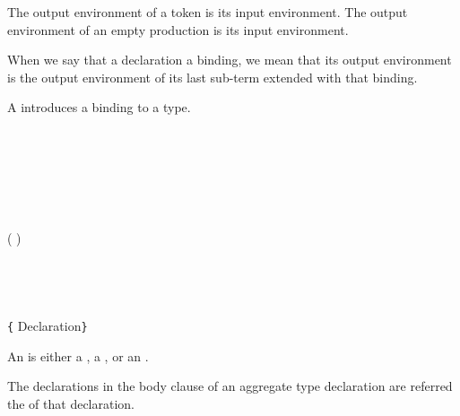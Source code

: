 The output environment of a token is its input environment.
The output environment of an empty production is its input environment.

When we say that a declaration  a binding, we mean that its output environment is the output environment of its last sub-term extended with that binding.





A  introduces a binding to a type.

\begin{Syntax}
     \\
         \\
        \SynOr {} \\
        \SynOr {} \\
\end{Syntax}


\begin{Syntax}
     \\
        ( \SynOr {} \SynOr {})  \\
        \SynOpt \\
        \SynOpt
        \SynOpt \\
         \code{;}\SynOpt\\

     \\
        \lstinline|{| Declaration\SynStar \lstinline|}| 
\end{Syntax}

An  is either a , a , or an .

The declarations in the body clause of an aggregate type declaration are referred the  of that declaration.


